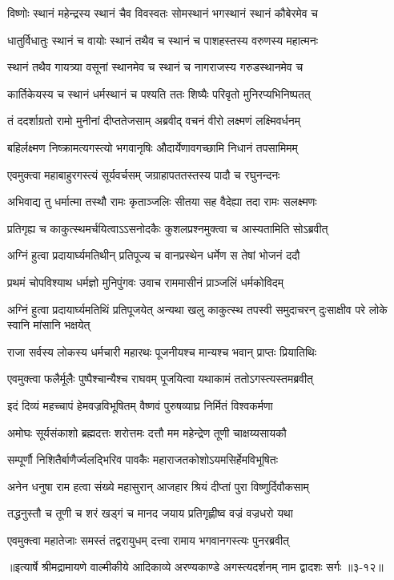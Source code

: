 \twolineshloka
{विष्णोः स्थानं महेन्द्रस्य स्थानं चैव विवस्वतः}
{सोमस्थानं भगस्थानं स्थानं कौबेरमेव च} %

\twolineshloka
{धातुर्विधातुः स्थानं च वायोः स्थानं तथैव च}
{स्थानं च पाशहस्तस्य वरुणस्य महात्मनः} %

\twolineshloka
{स्थानं तथैव गायत्र्या वसूनां स्थानमेव च}
{स्थानं च नागराजस्य गरुडस्थानमेव च} %

\twolineshloka
{कार्तिकेयस्य च स्थानं धर्मस्थानं च पश्यति}
{ततः शिष्यैः परिवृतो मुनिरप्यभिनिष्पतत्} %

\twolineshloka
{तं ददर्शाग्रतो रामो मुनीनां दीप्ततेजसाम्}
{अब्रवीद् वचनं वीरो लक्ष्मणं लक्ष्मिवर्धनम्} %

\twolineshloka
{बहिर्लक्ष्मण निष्क्रामत्यगस्त्यो भगवानृषिः}
{औदार्येणावगच्छामि निधानं तपसामिमम्} %

\twolineshloka
{एवमुक्त्वा महाबाहुरगस्त्यं सूर्यवर्चसम्}
{जग्राहापततस्तस्य पादौ च रघुनन्दनः} %

\twolineshloka
{अभिवाद्य तु धर्मात्मा तस्थौ रामः कृताञ्जलिः}
{सीतया सह वैदेह्या तदा रामः सलक्ष्मणः} %

\twolineshloka
{प्रतिगृह्य च काकुत्स्थमर्चयित्वाऽऽसनोदकैः}
{कुशलप्रश्नमुक्त्वा च आस्यतामिति सोऽब्रवीत्} %

\twolineshloka
{अग्निं हुत्वा प्रदायार्घ्यमतिथीन् प्रतिपूज्य च}
{वानप्रस्थेन धर्मेण स तेषां भोजनं ददौ} %

\twolineshloka
{प्रथमं चोपविश्याथ धर्मज्ञो मुनिपुंगवः}
{उवाच राममासीनं प्राञ्जलिं धर्मकोविदम्} %

\threelineshloka
{अग्निं हुत्वा प्रदायार्घ्यमतिथिं प्रतिपूजयेत्}
{अन्यथा खलु काकुत्स्थ तपस्वी समुदाचरन्}
{दुःसाक्षीव परे लोके स्वानि मांसानि भक्षयेत्} %

\twolineshloka
{राजा सर्वस्य लोकस्य धर्मचारी महारथः}
{पूजनीयश्च मान्यश्च भवान् प्राप्तः प्रियातिथिः} %

\twolineshloka
{एवमुक्त्वा फलैर्मूलैः पुष्पैश्चान्यैश्च राघवम्}
{पूजयित्वा यथाकामं ततोऽगस्त्यस्तमब्रवीत्} %

\twolineshloka
{इदं दिव्यं महच्चापं हेमवज्रविभूषितम्}
{वैष्णवं पुरुषव्याघ्र निर्मितं विश्वकर्मणा} %

\twolineshloka
{अमोघः सूर्यसंकाशो ब्रह्मदत्तः शरोत्तमः}
{दत्तौ मम महेन्द्रेण तूणी चाक्षय्यसायकौ} %

\twolineshloka
{सम्पूर्णौ निशितैर्बाणैर्ज्वलद्भिरिव पावकैः}
{महाराजतकोशोऽयमसिर्हेमविभूषितः} %

\twolineshloka
{अनेन धनुषा राम हत्वा संख्ये महासुरान्}
{आजहार श्रियं दीप्तां पुरा विष्णुर्दिवौकसाम्} %

\twolineshloka
{तद्धनुस्तौ च तूणी च शरं खड्गं च मानद}
{जयाय प्रतिगृह्णीष्व वज्रं वज्रधरो यथा} %

\twolineshloka
{एवमुक्त्वा महातेजाः समस्तं तद्वरायुधम्}
{दत्त्वा रामाय भगवानगस्त्यः पुनरब्रवीत्} %


॥इत्यार्षे श्रीमद्रामायणे वाल्मीकीये आदिकाव्ये अरण्यकाण्डे अगस्त्यदर्शनम् नाम द्वादशः सर्गः ॥३-१२॥
